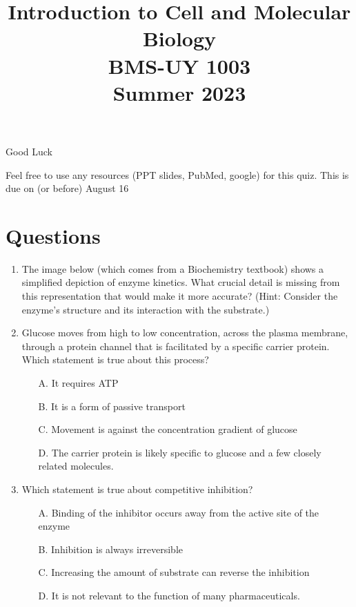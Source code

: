 \documentclass{article}
\begin{document}
\title{Introduction to Cell and Molecular Biology \\ BMS-UY 1003 \\ Summer 2023}
\date{}
\maketitle

Good Luck 

Feel free to use any resources (PPT slides, PubMed, google) for this quiz.
This is due on (or before) August 16 

\section*{Questions}

\begin{enumerate}
    \item The image below (which comes from a Biochemistry textbook) shows a simplified depiction of enzyme kinetics.  What crucial detail is missing from this representation that would make it more accurate?  (Hint: Consider the enzyme's structure and its interaction with the substrate.)

    \item Glucose moves from high to low concentration, across the plasma membrane, through a protein channel that is facilitated by a specific carrier protein. Which statement is true about this process?
    \begin{itemize}
        \item[A.] It requires ATP
        \item[B.] It is a form of passive transport
        \item[C.] Movement is against the concentration gradient of glucose
        \item[D.] The carrier protein is likely specific to glucose and a few closely related molecules.
    \end{itemize}

    \item Which statement is true about competitive inhibition?
    \begin{itemize}
        \item[A.] Binding of the inhibitor occurs away from the active site of the enzyme
        \item[B.] Inhibition is always irreversible
        \item[C.] Increasing the amount of substrate can reverse the inhibition
        \item[D.]  It is not relevant to the function of many pharmaceuticals.
    \end{itemize}


\end{enumerate}
\end{document}
